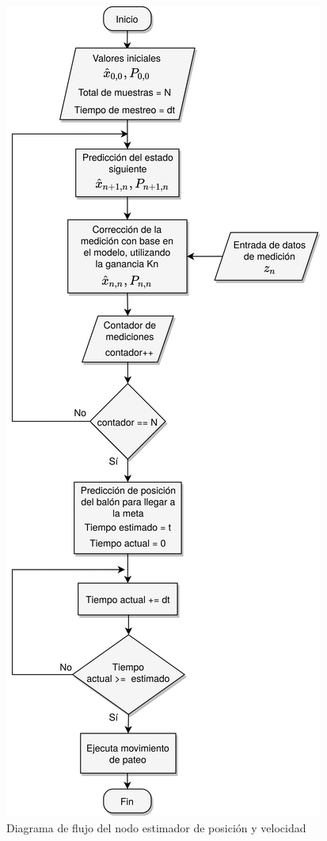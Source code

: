 \begin{figure}
	\centering
	\includegraphics[scale=0.055]{images/kalman_flux_diagram.png}
	\caption{Diagrama de flujo del nodo estimador de posición y velocidad}
	\label{fig:kalman_flux_diagram}
\end{figure}

		
		
		
	